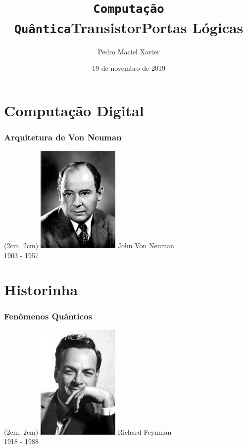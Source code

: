 \documentclass[14pt]{beamer}
\title{\texttt{Computação Quântica}}
\institute{IM-UFRJ}
\date{19 de novembro de 2019}
\author{Pedro Maciel Xavier}
\begin{document}
	

	\section{Computação Digital}	
	\frame%
	{
		\title{Transistor}
	}

	\frame%
	{
		\title{Portas Lógicas}
	}

	\frame%
	{
		\frametitle{Arquitetura de Von Neuman}
		
		\begin{textblock*}{4cm}(2cm, 2cm) %
			\includegraphics[width=4cm]{von-neuman.jpg}
			John Von Neuman\\
			{\centering\small 1903 - 1957}
		\end{textblock*}
	}

	\section{Historinha}
	\frame%
	{
		\frametitle{Fenômenos Quânticos}
		
		\begin{textblock*}{4cm}(2cm, 2cm) %
			\includegraphics[width=4cm]{feynman.jpg}
			Richard Feynman\\
			{\centering\small 1918 - 1988}
		\end{textblock*}		
	}
	
	\frame%
	{
				
	}
\end{document}
